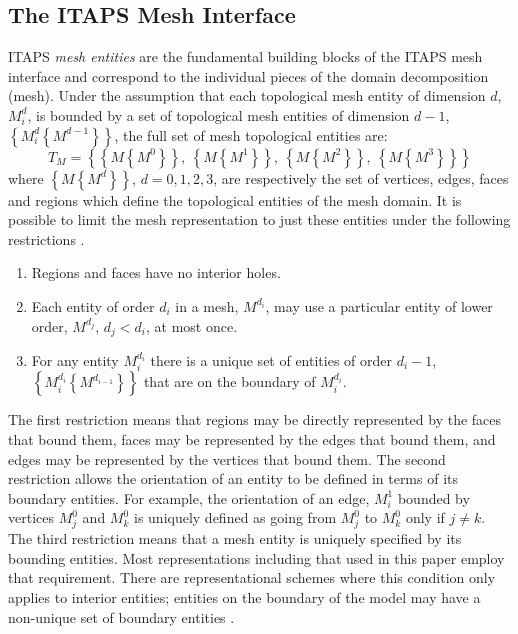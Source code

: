 \subsection{The ITAPS Mesh Interface}
\label{sec:mesh}

ITAPS {\it mesh entities} are the fundamental building blocks of the
ITAPS mesh interface and correspond to the individual pieces of the
domain decomposition (mesh).  Under the assumption that each
topological mesh entity of dimension $d$, $M^d_i$, is bounded by a set
of topological mesh entities of dimension $d-1$, $\left\{ M^d_i
\left\{ M^{d-1}
\right\} \right\}$, the full set of mesh topological entities are:
\begin{equation}
T_M = \left\{ \left\{ M \left\{ M^0 \right\} \right\},~
\left\{ M \left\{ M^1 \right\} \right\},~
\left\{ M \left\{ M^2 \right\} \right\},~
\left\{ M \left\{ M^3 \right\} \right\} \right\}
\end{equation}
where $\left\{ M \left\{ M^{d} \right\} \right\}$, $d=0,1,2,3$, are
respectively the set of vertices, edges, faces and regions which
define the topological entities of the mesh domain. It is
possible to limit the mesh representation to just these entities under
the following restrictions \cite{BeSh97}.
\begin{enumerate}
\item Regions and faces have no interior holes.
\item Each entity of order $d_i$ in a mesh, $M^{d_i}$, may use a particular entity of
lower order, $M^{d_j}$, $d_j<d_i$, at most once.
\item	For any entity $M^{d_i}_i$ there is a unique set of entities of order $d_i-1$,
$\left \{ M^{d_i}_i \left\{M^{d_{i-1}} \right\} \right\}$  that 
are on the boundary of $M^{d_i}_i$.
\end{enumerate}

The first restriction means that regions may be directly represented
by the faces that bound them, faces may be represented by the edges
that bound them, and edges may be represented by the vertices that
bound them. The second restriction allows the orientation of an entity
to be defined in terms of its boundary entities.  For example, the
orientation of an edge, $M^1_i$ bounded by vertices $M^0_j$ and
$M^0_k$ is uniquely defined as going from $M^0_j$ to $M^0_k$ only if
$j \neq k$. The third restriction means that a mesh entity is uniquely
specified by its bounding entities. Most representations including
that used in this paper employ that requirement. There are
representational schemes where this condition only applies to interior
entities; entities on the boundary of the model may have a non-unique
set of boundary entities \cite{BeSh97}.

